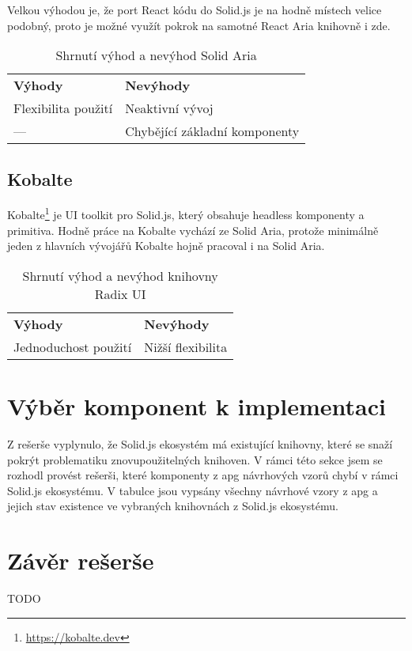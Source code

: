 Velkou výhodou je, že port React kódu do Solid.js je na hodně místech velice podobný, proto je možné využít pokrok na samotné React Aria knihovně i zde.

\begin{table}[ht]
    \begin{ctucolortab}
        \begin{tabularx}{\textwidth}{Y Y}
            \bfseries \textcolor{OK}{Výhody} & \bfseries \textcolor{NOT_OK}{Nevýhody} \\\Midrule{}
            Flexibilita použití              & Neaktivní vývoj                        \\
            ---                              & Chybějící základní komponenty
        \end{tabularx}
    \end{ctucolortab}
    \caption{Shrnutí výhod a nevýhod Solid Aria}
\end{table}

\subsection{Kobalte}

Kobalte\footnote{\url{https://kobalte.dev}} je UI toolkit pro Solid.js, který obsahuje headless komponenty a primitiva.
Hodně práce na Kobalte vychází ze Solid Aria, protože minimálně jeden z hlavních vývojářů Kobalte hojně pracoval i na Solid Aria.

\begin{table}[ht]
    \begin{ctucolortab}
        \begin{tabularx}{\textwidth}{Y Y}
            \bfseries \textcolor{OK}{Výhody} & \bfseries \textcolor{NOT_OK}{Nevýhody} \\\Midrule{}
            Jednoduchost použití             & Nižší flexibilita
        \end{tabularx}
    \end{ctucolortab}
    \caption{Shrnutí výhod a nevýhod knihovny Radix UI}
\end{table}

\section{Výběr komponent k implementaci}

Z rešerše vyplynulo, že Solid.js ekosystém má existující knihovny, které se snaží pokrýt problematiku znovupoužitelných knihoven.
V rámci této sekce jsem se rozhodl provést rešerši, které komponenty z \gls{apg} návrhových vzorů chybí v rámci Solid.js ekosystému.
V tabulce jsou vypsány všechny návrhové vzory z \gls{apg} a jejich stav existence ve vybraných knihovnách z Solid.js ekosystému.

\section{Závěr rešerše}

TODO
